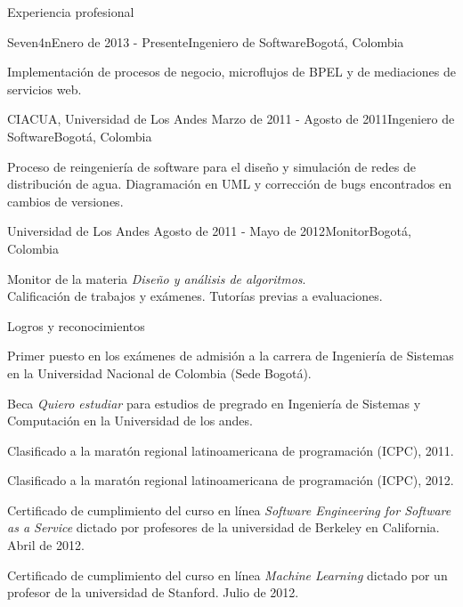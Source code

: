 \documentclass{resume} %
\def\uniandes{Universidad de Los Andes }
\begin{document}
\begin{rSection}{Experiencia profesional}

\begin{rSubsection}{Seven4n}{Enero de 2013 - Presente}{Ingeniero de Software}{Bogot\'a, Colombia}
\item Implementaci\'on de procesos de negocio, microflujos de BPEL y de mediaciones de servicios web.
\end{rSubsection}


\begin{rSubsection}{CIACUA, \uniandes}{Marzo de 2011 - Agosto de 2011}{Ingeniero de Software}{Bogot\'a, Colombia}
\item Proceso de reingenier\'ia de software para el dise\~{n}o y simulaci\'on de redes de distribuci\'on de agua. Diagramaci\'on en UML y correcci\'on de bugs encontrados en cambios de versiones.
\end{rSubsection}


\begin{rSubsection}{\uniandes}{Agosto de 2011 - Mayo de 2012}{Monitor}{Bogot\'a, Colombia}
\item Monitor de la materia \textit{Dise\~{n}o y an\'alisis de algoritmos}.\\
Calificaci\'on de trabajos y ex\'amenes. Tutor\'ias previas a evaluaciones.
\end{rSubsection}

\end{rSection}

\begin{rSection}{Logros y reconocimientos}
\begin{rSubsection}{}{}{}{}
\item Primer puesto en los ex\'amenes de admisi\'on a la carrera de Ingenier\'ia de Sistemas en la Universidad Nacional de Colombia (Sede Bogot\'a).
\item Beca \textsl{Quiero estudiar} para estudios de pregrado en Ingenier\'ia de Sistemas y Computaci\'on en la Universidad de los andes.
\item Clasificado a la marat\'on regional latinoamericana de programaci\'on (ICPC), 2011.
\item Clasificado a la marat\'on regional latinoamericana de programaci\'on (ICPC), 2012.
\item Certificado de cumplimiento del curso en l\'inea \textit{Software Engineering for Software as a Service} dictado por profesores de la universidad de Berkeley en California. Abril de 2012.
\item Certificado de cumplimiento del curso en l\'inea \textit{Machine Learning} dictado por un profesor de la universidad de Stanford. Julio de 2012.
\end{rSubsection}
\end{rSection}
\end{document}
